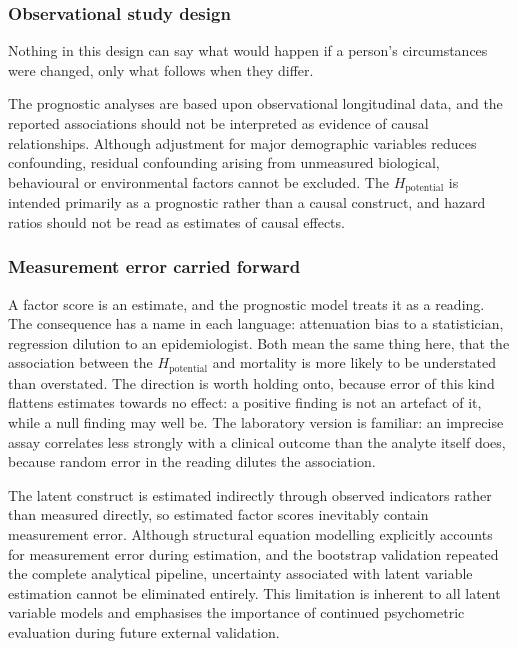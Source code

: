 \subsubsection{Observational study design}

Nothing in this design can say what would happen if a person's circumstances were
changed, only what follows when they differ.

The prognostic analyses are based upon observational longitudinal data, and the reported associations should not be interpreted as evidence of causal relationships. Although adjustment for major demographic variables reduces confounding, residual confounding arising from unmeasured biological, behavioural or environmental factors cannot be excluded. The $H_{\text{potential}}$ is intended primarily as a prognostic rather than a causal construct, and hazard ratios should not be read as estimates of causal effects.

\subsubsection{Measurement error carried forward}

A factor score is an estimate, and the prognostic model treats it as a reading.
The consequence has a name in each language: attenuation bias to a statistician,
regression dilution to an epidemiologist. Both mean the same thing here, that the
association between the $H_{\text{potential}}$ and mortality is more likely to be
understated than overstated. The direction is worth holding onto, because error
of this kind flattens estimates towards no effect: a positive finding is not an
artefact of it, while a null finding may well be. The laboratory version is
familiar: an imprecise assay correlates less strongly with a clinical outcome
than the analyte itself does, because random error in the reading dilutes the
association.

The latent construct is estimated indirectly through observed indicators rather than measured directly, so estimated factor scores inevitably contain measurement error. Although structural equation modelling explicitly accounts for measurement error during estimation, and the bootstrap validation repeated the complete analytical pipeline, uncertainty associated with latent variable estimation cannot be eliminated entirely. This limitation is inherent to all latent variable models and emphasises the importance of continued psychometric evaluation during future external validation.

